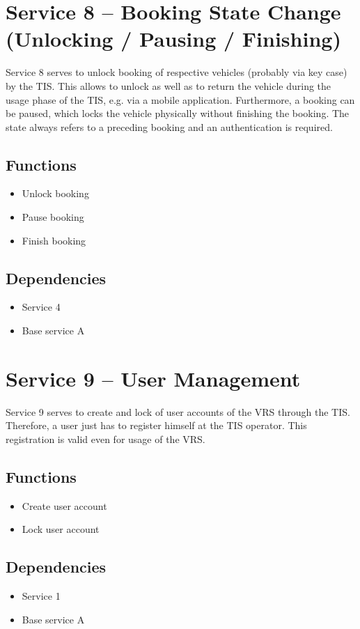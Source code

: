 \section{Service 8 -- Booking State Change (Unlocking / Pausing / Finishing)}
Service 8 serves to unlock booking of respective vehicles (probably via key case) by the TIS. This allows to unlock as well as to return the vehicle during the usage phase of the TIS, e.g. via a mobile application. Furthermore, a booking can be paused, which locks the vehicle physically without finishing the booking. 
The state always refers to a preceding booking and an authentication is required.  

\subsection*{Functions}
\begin{itemize}
\item Unlock booking
\item Pause booking 
\item Finish booking 
\end{itemize}

\subsection*{Dependencies}
\begin{itemize}
\item Service 4
\item Base service A
\end{itemize}

\section{Service 9 -- User Management}
Service 9 serves to create and lock of user accounts of the VRS through the TIS. Therefore, a user just has to register himself at the TIS operator. This registration is valid even for usage of the VRS.

\subsection*{Functions}
\begin{itemize}
\item Create user account
\item Lock user account
\end{itemize}

\subsection*{Dependencies}
\begin{itemize}
\item Service 1
\item Base service A
\end{itemize}


